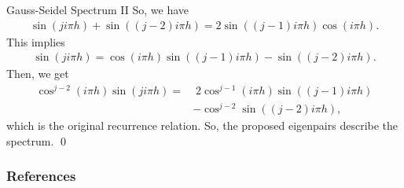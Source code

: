 \documentclass{beamer}
\begin{document}
\begin{frame}{Gauss-Seidel Spectrum II}
  So, we have
  \begin{align}
   \sin(ji\pi h) + \sin((j-2)i\pi h) = 2 \sin\left( (j-1)i\pi h \right) \cos\left( i\pi h \right). \nonumber
  \end{align}
  This implies
  \begin{align}
   \sin(ji\pi h) = \cos(i \pi h) \sin((j-1)i\pi h) - \sin((j-2)i\pi h). \nonumber
  \end{align}
  Then, we get
  \begin{align}
   \cos^{j-2}(i\pi h)\sin(ji\pi h) =& \; 2\cos^{j-1}(i \pi h) \sin((j-1)i\pi h) \nonumber \\
                                      &- \cos^{j-2}\sin((j-2)i\pi h), \nonumber
  \end{align}
  which is the original recurrence relation.
  So, the proposed eigenpairs describe the spectrum.
  \qed \\
  \hyperlink{gaussSeidel}{}
\end{frame}

\begin{frame}[allowframebreaks]
 \frametitle{References}
 
 
\end{frame}
\end{document}
